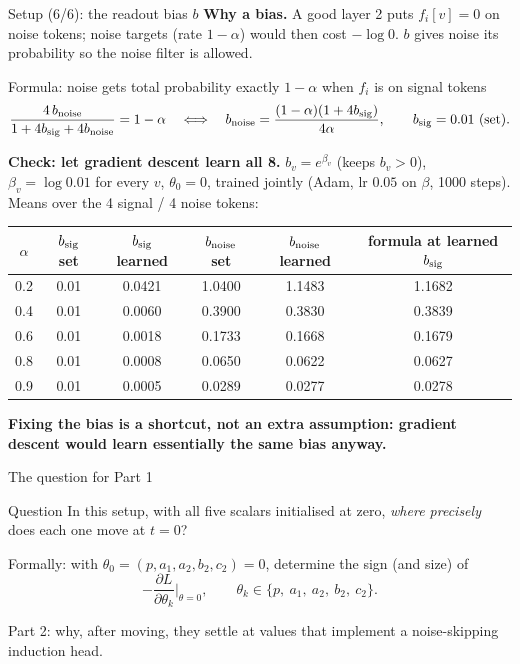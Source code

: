 \documentclass[aspectratio=169,11pt]{beamer}
\newcommand{\1}{\mathbf{1}}
\begin{document}
\begin{frame}{Setup (6/6): the readout bias $b$}
\footnotesize
\textbf{Why a bias.} A good layer 2 puts $f_i[v]=0$ on noise tokens; noise targets (rate $1-\alpha$) would then cost $-\log0$.
$b$ gives noise its probability so the noise filter is allowed.
\begin{block}{Formula: noise gets total probability exactly $1-\alpha$ when $f_i$ is on signal tokens}
\vspace{-0.6em}
\[
\frac{4\,b_{\rm noise}}{1+4b_{\rm sig}+4b_{\rm noise}}=1-\alpha
\quad\Longleftrightarrow\quad
b_{\rm noise}=\frac{(1-\alpha)(1+4b_{\rm sig})}{4\alpha},\qquad b_{\rm sig}=0.01\ \text{(set)}.
\]
\end{block}
\textbf{Check: let gradient descent learn all 8.} $b_v=e^{\beta_v}$ (keeps $b_v>0$), $\beta_v=\log0.01$ for every $v$,
$\theta_0=0$, trained jointly (Adam, lr $0.05$ on $\beta$, 1000 steps). Means over the 4 signal / 4 noise tokens:
\begin{center}
\begin{tabular}{cccccc}\toprule
$\alpha$ & $b_{\rm sig}$ set & $b_{\rm sig}$ learned & $b_{\rm noise}$ set & $b_{\rm noise}$ learned & formula at learned $b_{\rm sig}$\\\midrule
0.2 & 0.01 & 0.0421 & 1.0400 & 1.1483 & 1.1682\\
0.4 & 0.01 & 0.0060 & 0.3900 & 0.3830 & 0.3839\\
0.6 & 0.01 & 0.0018 & 0.1733 & 0.1668 & 0.1679\\
0.8 & 0.01 & 0.0008 & 0.0650 & 0.0622 & 0.0627\\
0.9 & 0.01 & 0.0005 & 0.0289 & 0.0277 & 0.0278\\\bottomrule
\end{tabular}
\end{center}
\textbf{Fixing the bias is a shortcut, not an extra assumption: gradient descent would learn essentially the same bias anyway.}
\end{frame}


\begin{frame}{The question for Part 1}
\vfill
\begin{block}{Question}
\large In this setup, with all five scalars initialised at zero, \emph{where precisely} does each one move at $t=0$?
\end{block}
\vspace{0.6em}
\begin{center}
Formally: with $\theta_0=(p,a_1,a_2,b_2,c_2)=0$, determine the sign (and size) of
\[
-\frac{\partial L}{\partial \theta_k}\Big|_{\theta=0},\qquad \theta_k\in\{p,\ a_1,\ a_2,\ b_2,\ c_2\}.
\]
\end{center}
\vfill
{\footnotesize\color{gray} Part 2: why, after moving, they settle at values that implement a noise-skipping induction head.}
\end{frame}
\end{document}
